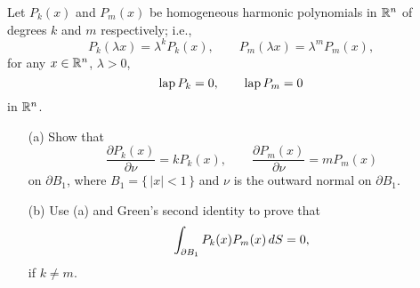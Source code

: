 \begin{problem}
  Let \(P_k(x)\) and \(P_m(x)\) be homogeneous harmonic polynomials in
  \(\mathbb{R}^n\) of degrees \(k\) and \(m\) respectively; i.e.,
  \[
    P_k(\lambda x)=\lambda^kP_k(x),\qquad P_m(\lambda x)=\lambda^mP_m(x),
  \]
  for any \(x\in\mathbb{R}^n\), \(\lambda>0\),
  \[
    \operatorname{lap} P_k=0,\qquad\operatorname{lap} P_m=0
  \]
  in \(\mathbb{R}^n\).
  \begin{itemize}[noitemsep]
  \item[(a)] Show that
    \[
      \frac{\partial P_k(x)}{\partial\nu}=kP_k(x),\qquad
      \frac{\partial P_m(x)}{\partial \nu}=mP_m(x)
    \]
    on \(\partial B_1\), where \(B_1=\{\,|x|<1\,\}\) and \(\nu\) is the
    outward normal on \(\partial B_1\).
  \item[(b)] Use (a) and Green's second identity to prove that
    \[
      \int_{\partial B_1} P_k(x)P_m(x)\mathop{}\!d S=0,
    \]
    if \(k\neq m\).
  \end{itemize}
\end{problem}
\begin{solution*}
\end{solution*}

